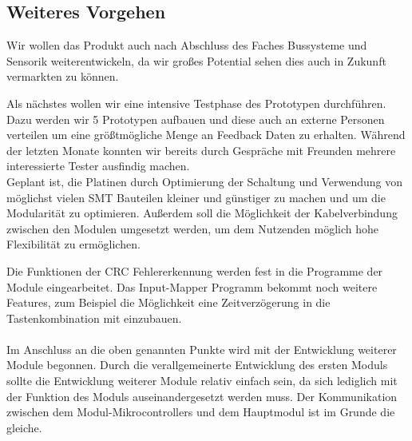 \subsection{Weiteres Vorgehen}
Wir wollen das Produkt auch nach Abschluss des Faches \glqq Bussysteme und Sensorik\grqq{} weiterentwickeln, da wir großes Potential sehen dies auch in Zukunft vermarkten zu können.

Als nächstes wollen wir eine intensive Testphase des Prototypen durchführen. Dazu werden wir 5 Prototypen aufbauen und diese auch an externe Personen verteilen um eine größtmögliche Menge an Feedback Daten zu erhalten.
Während der letzten Monate konnten wir bereits durch Gespräche mit Freunden mehrere interessierte Tester ausfindig machen. \\

Geplant ist, die Platinen durch Optimierung der Schaltung und Verwendung von möglichst vielen SMT Bauteilen kleiner und günstiger zu machen und um die Modularität zu optimieren. Außerdem soll die Möglichkeit der Kabelverbindung zwischen den Modulen umgesetzt werden, um dem Nutzenden möglich hohe Flexibilität zu ermöglichen. \newline 

Die Funktionen der CRC Fehlererkennung werden fest in die Programme der Module eingearbeitet. Das Input-Mapper Programm bekommt noch weitere Features, zum Beispiel die Möglichkeit eine Zeitverzögerung in die Tastenkombination mit einzubauen.
\\\\
Im Anschluss an die oben genannten Punkte wird mit der Entwicklung weiterer Module begonnen. Durch die verallgemeinerte Entwicklung des ersten Moduls sollte die Entwicklung weiterer Module relativ einfach sein, da sich lediglich mit der Funktion des Moduls auseinandergesetzt werden muss. Der Kommunikation zwischen dem Modul-Mikrocontrollers und dem Hauptmodul ist im Grunde die gleiche.
